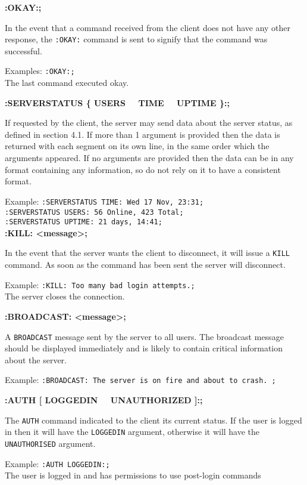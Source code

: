 {\bf :OKAY:;}

In the event that a command received from the client does not have any other response, the \texttt{:OKAY:} command is sent to signify that the command was successful. 

Examples:
\texttt{:OKAY:;}\\
The last command executed okay.

{\bf :SERVERSTATUS \{ USERS \ \vline \ TIME \ \vline \ UPTIME \}:;}

If requested by the client, the server may send data about the server status, as defined in section 4.1. If more than 1 argument is provided then the data is returned with each segment on its own line, in the same order which the arguments appeared. If no arguments are provided then the data can be in any format containing any information, so do not rely on it to have a consistent format.

Example:
\texttt{:SERVERSTATUS TIME: Wed 17 Nov, 23:31;} \\
\texttt{:SERVERSTATUS USERS: 56 Online, 423 Total;} \\
\texttt{:SERVERSTATUS UPTIME: 21 days, 14:41;} \\

{\bf :KILL: <message>;}

In the event that the server wants the client to disconnect, it will issue a \texttt{KILL} command. As soon as the command has been sent the server will disconnect. 

Example:
\texttt{:KILL: Too many bad login attempts.;}\\
The server closes the connection.

{\bf :BROADCAST: <message>;}

A \texttt{BROADCAST} message sent by the server to all users. The broadcast message should be displayed immediately and is likely to contain critical information about the server.

Example:
\texttt{:BROADCAST: The server is on fire and about to crash. ;}

{\bf :AUTH [ LOGGEDIN \ \vline \ UNAUTHORIZED ]:;}

The \texttt{AUTH} command indicated to the client its current status. If the user is logged in then it will have the \texttt{LOGGEDIN} argument, otherwise it will have the \texttt{UNAUTHORISED} argument.

Example:
\texttt{:AUTH LOGGEDIN:;}\\
The user is logged in and has permissions to use post-login commands


